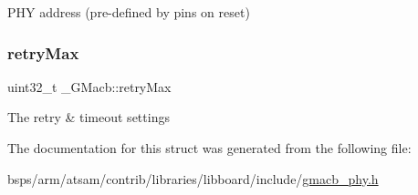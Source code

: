 P\+HY address (pre-\/defined by pins on reset) \mbox{\label{struct__GMacb_abc231a110ba755f5b292729ddf545fcf}} 
\subsubsection{\texorpdfstring{retryMax}{retryMax}}
{\footnotesize\ttfamily uint32\+\_\+t \+\_\+\+G\+Macb\+::retry\+Max}

The retry \& timeout settings 

The documentation for this struct was generated from the following file\+:\begin{DoxyCompactItemize}
\item 
bsps/arm/atsam/contrib/libraries/libboard/include/\mbox{\hyperlink{gmacb__phy_8h}{gmacb\+\_\+phy.\+h}}\end{DoxyCompactItemize}
